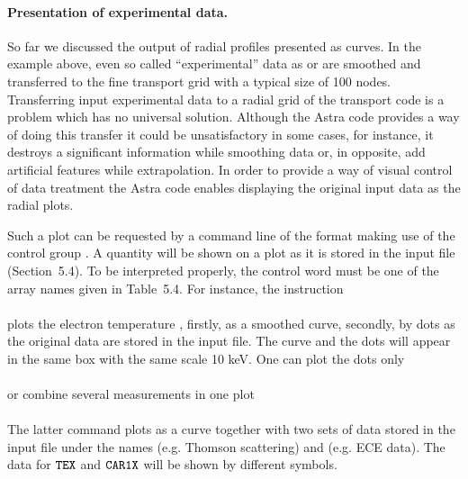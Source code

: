 \paragraph{Presentation of experimental data.}
So far we discussed the output of radial profiles presented as curves.
In the example above, even so called ``experimental'' data as 
or  are smoothed and transferred to the fine transport grid
with a typical size of 100 nodes. 
Transferring input experimental data to a radial grid of the 
transport code is a problem which has no universal solution. 
Although the Astra code provides a way of doing this transfer
it could be unsatisfactory in some cases, for instance, it destroys
a significant information while smoothing data or, in opposite, add 
artificial features while extrapolation.
In order to provide a way of visual control of data treatment
the Astra code enables displaying the original input data as the
radial plots. 

Such a plot can be requested by a command line of the format 
making use of the control group .
A quantity  will be shown on a plot as it is stored in the
input file (Section~5.4). 
To be interpreted properly, the control word  must be one of
the array names given in Table~5.4.
For instance, the instruction \\
\hspace*{5cm}{\tt Tex\bs TEX\bs\bs TEX\bs 10}\\
plots the electron temperature , firstly, as a smoothed curve,
secondly, by dots as the original data are stored in the input file.
The curve and the dots will appear in the same box with the same
scale 10 keV. 
One can plot the dots only \\
\hspace*{5cm}{\tt Tex\bs\bs TEX\qquad\qquad\qquad}\\
or combine several measurements in one plot\\
\hspace*{5cm}{\tt Tex\bs TEX\bs\bs TEX\bs\bs CAR1X}\\
The latter command plots  as a curve together with two sets of
data stored in the input file under the names  (e.g. Thomson
scattering) and  (e.g. ECE data). 
The data for $\tt TEX$ and $\tt CAR1X$ will be shown by different
symbols. 


